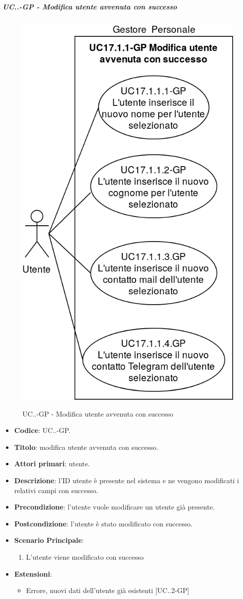 		\subparagraph{UC\theuccount.\thesubuccount.\thesubsubuccount-GP - Modifica utente avvenuta con successo}
			\begin{figure}[H]
				\centering
				\includegraphics[width=0.5\columnwidth]{img/casi_d'uso/UC17_1_1.png}\\
				\caption{UC\theuccount.\thesubuccount.\thesubsubuccount-GP - Modifica utente avvenuta con successo}
			\end{figure}
			\begin{itemize}
				\item \textbf{Codice}: UC\theuccount.\thesubuccount.\thesubsubuccount-GP.
				\item \textbf{Titolo}: modifica utente avvenuta con successo.
				\item \textbf{Attori primari}: utente.
				\item \textbf{Descrizione}: l'ID utente è presente nel sistema e ne vengono modificati i relativi campi con successo.
				\item \textbf{Precondizione}: l'utente vuole modificare un utente già presente.
				\item \textbf{Postcondizione}: l'utente è stato modificato con successo.
				\item \textbf{Scenario Principale}:
				\begin{enumerate}
					\item L'utente viene modificato con successo
				\end{enumerate}
				\item \textbf{Estensioni}:
				\begin{itemize}
					\item Errore, nuovi dati dell'utente già esistenti [UC\theuccount.\thesubuccount.2-GP]
				\end{itemize}
			\end{itemize}
			
